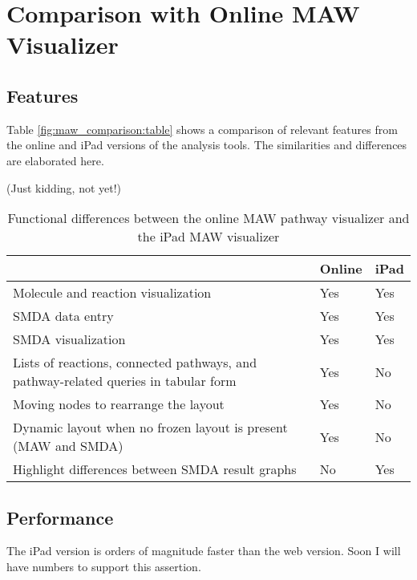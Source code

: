 \section{Comparison with Online MAW Visualizer}
\label{sect:maw_comparison}

\subsection{Features}
\label{sect:maw_comparison_features}

Table \ref{fig:maw_comparison:table} shows a comparison of relevant features
from the online and iPad versions of the \pathcasemaw analysis tools. The
similarities and differences are elaborated here.

(Just kidding, not yet!)

\begin{table}[ht!]
\centering
\begin{tabular}{ | p{3in} | l | l | }
    \hline
                        & Online    & iPad \\ \hline

    Molecule and reaction visualization
                        & Yes       & Yes \\ \hline

    SMDA data entry     & Yes       & Yes \\ \hline

    SMDA visualization  & Yes       & Yes \\ \hline

    Lists of reactions, connected pathways, and pathway-related queries in
    tabular form
                        & Yes       & No \\ \hline

    Moving nodes to rearrange the layout
                        & Yes       & No \\ \hline

    Dynamic layout when no frozen layout is present (MAW and SMDA)
                        & Yes       & No \\ \hline

    Highlight differences between SMDA result graphs
                        & No        & Yes \\ \hline
\end{tabular}
    \label{fig:maw_comparison_table}
    \caption{Functional differences between the online MAW pathway visualizer
    and the iPad MAW visualizer}
\end{table}

\subsection{Performance}
\label{sect:kegg_comparison_performance}

The iPad version is orders of magnitude faster than the web version. Soon I will
have numbers to support this assertion.
